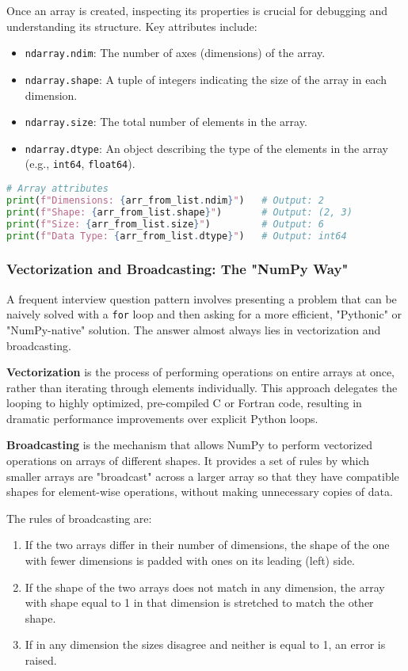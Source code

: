 \documentclass[11pt,a4paper]{article}
\begin{document}
Once an array is created, inspecting its properties is crucial for debugging and understanding its structure. Key attributes include:
\begin{itemize}
    \item \texttt{ndarray.ndim}: The number of axes (dimensions) of the array.
    \item \texttt{ndarray.shape}: A tuple of integers indicating the size of the array in each dimension.
    \item \texttt{ndarray.size}: The total number of elements in the array.
    \item \texttt{ndarray.dtype}: An object describing the type of the elements in the array (e.g., \texttt{int64}, \texttt{float64}).
\end{itemize}

\begin{lstlisting}[language=Python]
# Array attributes
print(f"Dimensions: {arr_from_list.ndim}")   # Output: 2
print(f"Shape: {arr_from_list.shape}")       # Output: (2, 3)
print(f"Size: {arr_from_list.size}")         # Output: 6
print(f"Data Type: {arr_from_list.dtype}")   # Output: int64
\end{lstlisting}

\subsubsection{Vectorization and Broadcasting: The "NumPy Way"}

A frequent interview question pattern involves presenting a problem that can be naively solved with a \texttt{for} loop and then asking for a more efficient, "Pythonic" or "NumPy-native" solution. The answer almost always lies in vectorization and broadcasting.

\textbf{Vectorization} is the process of performing operations on entire arrays at once, rather than iterating through elements individually. This approach delegates the looping to highly optimized, pre-compiled C or Fortran code, resulting in dramatic performance improvements over explicit Python loops.

\textbf{Broadcasting} is the mechanism that allows NumPy to perform vectorized operations on arrays of different shapes. It provides a set of rules by which smaller arrays are "broadcast" across a larger array so that they have compatible shapes for element-wise operations, without making unnecessary copies of data.

The rules of broadcasting are:
\begin{enumerate}
    \item If the two arrays differ in their number of dimensions, the shape of the one with fewer dimensions is padded with ones on its leading (left) side.
    \item If the shape of the two arrays does not match in any dimension, the array with shape equal to 1 in that dimension is stretched to match the other shape.
    \item If in any dimension the sizes disagree and neither is equal to 1, an error is raised.
\end{enumerate}
\end{document}
